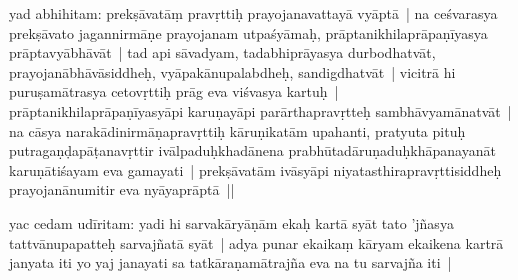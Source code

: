 \documentclass[article,12pt,a4paper]{memoir}%
\newcounter{parCount}
\begin{document}
	  \pstart \leavevmode%
	\label{thakur75-35.22}yad abhihitam: \label{nk_3522_start}prekṣāvatāṃ pravṛttiḥ prayojanavattayā vyāptā | na ceśvarasya prekṣāvato jagannirmāṇe prayojanam utpaśyāmaḥ, prāptanikhilaprāpaṇīyasya prāptavyābhāvāt |\label{nk_3522_end} tad api sāvadyam, tadabhiprāyasya durbodhatvāt, prayojanābhāvāsiddheḥ, vyāpakānupalabdheḥ, sandigdhatvāt | vicitrā hi puruṣamātrasya cetovṛttiḥ prāg eva viśvasya kartuḥ | prāptanikhilaprāpaṇīyasyāpi karuṇayāpi parārtha\label{ratnakīrtinibandhāvali__36r1PF7IMWRV4JZSWYNB05SZCTW}pravṛtteḥ\label{ratnakīrtinibandhāvali__36r1PF7IMWR7I4SV0JG3GBCU654} sambhāvyamānatvāt | na cāsya narakādinirmāṇapravṛttiḥ kāruṇikatām upahanti, pratyuta pituḥ putragaṇḍapāṭanavṛttir ivālpaduḥkhadānena prabhūtadāruṇaduḥkhāpanayanāt karuṇātiśayam eva gamayati | prekṣāvatām ivāsyāpi niyatasthirapravṛttisiddheḥ prayojanānumitir eva nyāyaprāptā ||
	{}
	\pend%
      

	  \pstart \leavevmode%
	\label{thakur75-35.31}yac cedam udīritam: yadi hi sarvakāryāṇām ekaḥ kartā syāt tato 'jñasya tattvānupapatteḥ sarvajñatā syāt | \label{ratnakīrtinibandhāvali__36r1PF7IMWQKR7W5N7YIKB3F4T2}adya\label{ratnakīrtinibandhāvali__36r1PF7IMWPXIAKW6HP32AFTWQM} punar ekaikaṃ kāryam ekaikena kartrā \leavevmode{}\label{RNAms_20b} janyata iti yo yaj janayati sa tatkāraṇamātrajña eva na tu sarvajña iti |
	{}
	\pend%
      
\end{document}
